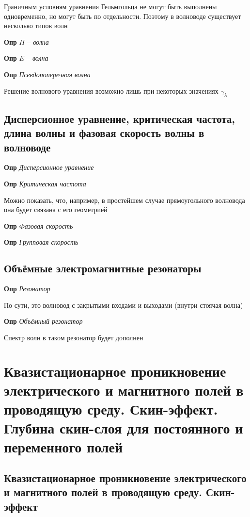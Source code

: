 \documentclass[a4paper, 14pt]{article}
\begin{document}
    Граничным условиям уравнения Гельмгольца не могут быть выполнены одновременно, но могут быть по отдельности.
    Поэтому в волноводе существует несколько типов волн
    
    \textbf{Опр} \textit{$H-$волна}
    
    \textbf{Опр} \textit{$E-$волна}
    
    \textbf{Опр} \textit{Псевдопоперечная волна}
    
    Решение волнового уравнения возможно лишь при некоторых значениях $\gamma_\lambda$
    
    \subsection{Дисперсионное уравнение, критическая частота, длина волны и фазовая скорость волны в волноводе}
    
    \textbf{Опр} \textit{Дисперсионное уравнение}
    
    \textbf{Опр} \textit{Критическая частота}
    
    Можно показать, что, например, в простейшем случае прямоугольного волновода она будет связана с его геометрией
    
    \textbf{Опр} \textit{Фазовая скорость}
    
    \textbf{Опр} \textit{Групповая скорость}
    
    \subsection{Объёмные электромагнитные резонаторы}
    
    \textbf{Опр} \textit{Резонатор}
    
    По сути, это волновод с закрытыми входами и выходами (внутри стоячая волна)
    
    \textbf{Опр} \textit{Объёмный резонатор}
    
    Спектр волн в таком резонатор будет дополнен
    
    \section{Квазистационарное проникновение электрического и магнитного полей в проводящую среду. Скин-эффект.
    Глубина скин-слоя для постоянного и переменного полей}
    
    \subsection{Квазистационарное проникновение электрического и магнитного полей в проводящую среду. Скин-эффект}
    
\end{document}
